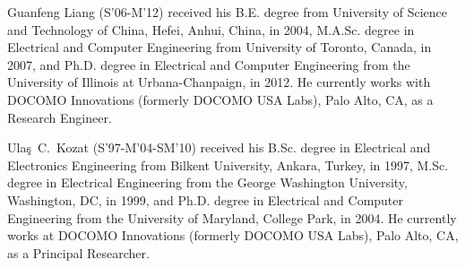 \documentclass[journal]{IEEEtran}
\begin{document}
\begin{IEEEbiography}{Guanfeng Liang}
(S'06-M'12)
received his B.E. degree from University of Science and Technology of China, Hefei, Anhui, China, in 2004, M.A.Sc. degree in Electrical and Computer Engineering from  University of Toronto, Canada, in 2007, and Ph.D. degree in Electrical and Computer Engineering from the University of Illinois at Urbana-Chanpaign, in 2012. 
He currently works with DOCOMO Innovations (formerly DOCOMO USA Labs), Palo Alto, CA, as a Research Engineer. 
\end{IEEEbiography}

\begin{IEEEbiography}{Ula\c{s}~C.~Kozat} 
(S’97-M’04-SM’10) received his
B.Sc. degree in Electrical and Electronics Engineering
from Bilkent University, Ankara, Turkey, in 1997,
M.Sc. degree in Electrical Engineering from the
George Washington University, Washington, DC, in
1999, and Ph.D. degree in Electrical and Computer
Engineering from the University of Maryland,
College Park, in 2004. He currently works at DOCOMO Innovations (formerly DOCOMO USA Labs), Palo Alto, CA, as
a Principal Researcher.
\end{IEEEbiography}
\end{document}
